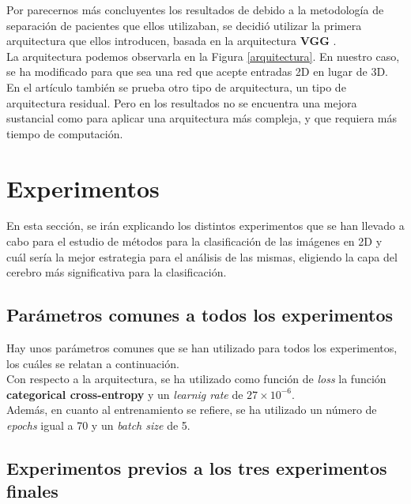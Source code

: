 Por parecernos más concluyentes los resultados de \cite{residualVGG} debido a la metodología de separación de pacientes que ellos utilizaban, se decidió utilizar la primera arquitectura que ellos introducen, basada en la arquitectura \textbf{VGG} \cite{SimonyanZ14a}.\\

La arquitectura podemos observarla en la Figura \ref{arquitectura}. En nuestro caso, se ha modificado para que sea una red que acepte entradas 2D en lugar de 3D.\\

En el artículo \cite{residualVGG} también se prueba otro tipo de arquitectura, un tipo de arquitectura residual. Pero en los resultados no se encuentra una mejora sustancial como para aplicar una arquitectura más compleja, y que requiera más tiempo de computación.\\
\section{Experimentos}

En esta sección, se irán explicando los distintos experimentos que se han llevado a cabo para el estudio de métodos para la clasificación de las imágenes en 2D y cuál sería la mejor estrategia para el análisis de las mismas, eligiendo la capa del cerebro más significativa para la clasificación.\\
\subsection{Parámetros comunes a todos los experimentos}

Hay unos parámetros comunes que se han utilizado para todos los experimentos, los cuáles se relatan a continuación.\\

Con respecto a la arquitectura, se ha utilizado como función de \textit{loss} la función \textbf{categorical cross-entropy} y un \textit{learnig rate} de \textbf{$27\times 10^{-6}$}.\\

Además, en cuanto al entrenamiento se refiere, se ha utilizado un número de \textit{epochs} igual a 70 y un \textit{batch size} de 5.\\
\subsection{Experimentos previos a los tres experimentos finales}


